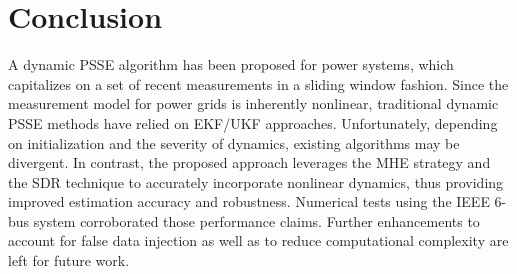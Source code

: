 \documentclass[conference]{IEEEtran}
\begin{document}
\section{Conclusion}
\label{sec6}
A dynamic PSSE algorithm has been proposed for power systems, which capitalizes on a set of recent measurements in a sliding window fashion. Since the measurement model for power grids is inherently nonlinear, traditional dynamic PSSE methods have relied on EKF/UKF approaches. Unfortunately, depending on initialization and the severity of dynamics, existing algorithms may be divergent. In contrast, the proposed approach leverages the MHE strategy and the SDR technique to accurately incorporate nonlinear dynamics, thus providing improved estimation accuracy and robustness. Numerical tests using the IEEE 6-bus system corroborated those performance claims. Further enhancements to account for false data injection as well as to reduce computational complexity are left for future work. 
\end{document}
